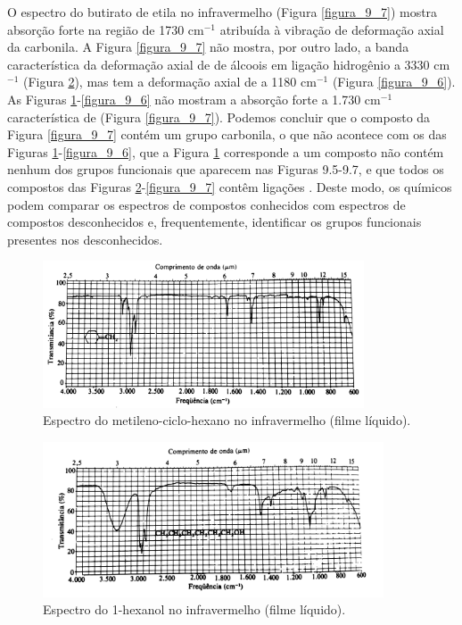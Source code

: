O espectro do butirato de etila no infravermelho (Figura \ref{figura_9_7}) mostra absorção forte na região de 1730 cm$^{-1}$ atribuída à vibração de deformação axial da carbonila. A Figura \ref{figura_9_7} não mostra, por outro lado, a banda característica da deformação axial de  de álcoois em ligação hidrogênio a 3330 cm$^{-1}$ (Figura \ref{figura_9_5}), mas tem a deformação axial de  a 1180 cm$^{-1}$ (Figura \ref{figura_9_6}). As Figuras \ref{figura_9_4}-\ref{figura_9_6} não mostram a absorção forte a 1.730 cm$^{-1}$ característica de  (Figura \ref{figura_9_7}). Podemos concluir que o composto da Figura \ref{figura_9_7} contém um grupo carbonila, o que não acontece com os das Figuras \ref{figura_9_4}-\ref{figura_9_6}, que a Figura \ref{figura_9_4} corresponde a um composto não contém nenhum dos grupos funcionais que aparecem nas Figuras 9.5-9.7, e que todos os compostos das Figuras \ref{figura_9_5}-\ref{figura_9_7} contêm ligações . Deste modo, os químicos podem comparar os espectros de compostos conhecidos com espectros de compostos desconhecidos e, frequentemente, identificar os grupos funcionais presentes nos desconhecidos.

\begin{figure}[H]
    \centering
    \includegraphics[width=0.85\textwidth,angle=0]{content/images/Figura_9_4.pdf}
    \caption{Espectro do metileno-ciclo-hexano no infravermelho (filme líquido).}
    \label{figura_9_4}
\end{figure}

\begin{figure}[H]
    \centering
    \includegraphics[width=0.9\textwidth,angle=0]{content/images/Figura_9_5.pdf}
    \caption{Espectro do 1-hexanol no infravermelho (filme líquido).}
    \label{figura_9_5}
\end{figure}

